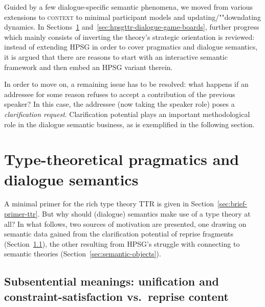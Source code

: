 \documentclass[output=paper
 	        ,biblatex
                ,babelshorthands
                ,newtxmath
                ,draftmode
                ,colorlinks, citecolor=brown
]{langscibook}
\begin{document}
Guided by a few dialogue-specific semantic phenomena, we moved from various extensions to \textsc{context}  to minimal participant models and updating/""downdating dynamics.
%
In Sections~\ref{sec:type-theory-pragmatics-semantics} and~\ref{sec:hpsgttr-dialogue-game-boards}, further progress which mainly consists of inverting the theory's strategic orientation is reviewed: instead of extending HPSG in order to cover pragmatics and dialogue semantics, it is argued that there are reasons to start with an interactive semantic framework and then embed an HPSG variant therein.


In order to move on, a remaining issue has to be resolved: what happens if an addressee for some reason refuses to accept a contribution of the previous speaker?
%
In this case, the addressee (now taking the speaker role) poses a \emph{clarification request}.
%
Clarification potential plays an important methodological role in the dialogue semantic business, as is exemplified in the following section. %




\section{Type-theoretical pragmatics and dialogue semantics}
\label{sec:type-theory-pragmatics-semantics}

A minimal primer for the rich type theory TTR is given in Section~\ref{sec:brief-primer-ttr}. 
%
But why should (dialogue) semantics make use of a type theory at all?
%
In what follows, two sources of motivation are presented, one drawing on semantic data gained from the clarification potential of reprise fragments (Section~\ref{sec:sub-sentential-meanings}), the other resulting from HPSG's struggle with connecting to semantic theories (Section~\ref{sec:semantic-objects}).



\subsection{Subsentential meanings: unification and constraint-satisfaction vs.\ reprise content}
\label{sec:sub-sentential-meanings}
\end{document}
